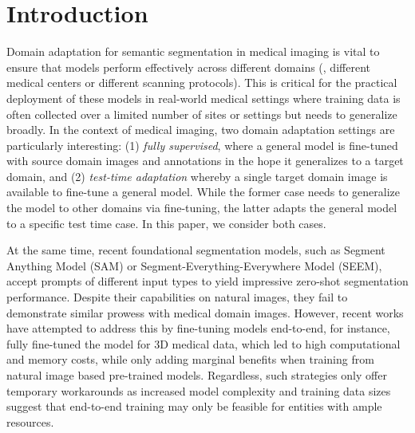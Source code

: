 \section{Introduction}
\label{sec:samda_introduction}

Domain adaptation for semantic segmentation in medical imaging is vital to ensure that models perform effectively across different domains (\eg, different medical centers or different scanning protocols). This is critical for the practical deployment of these models in real-world medical settings where training data is often collected over a limited number of sites or settings but needs to generalize broadly. In the context of medical imaging, two domain adaptation settings are particularly interesting: (1) {\it fully supervised}, where a general model is fine-tuned with source domain images and annotations in the hope it generalizes to a target domain, and (2) {\it test-time adaptation} whereby a single target domain image is available to fine-tune a general model. While the former case needs to generalize the model to other domains via fine-tuning, the latter adapts the general model to a specific test time case. In this paper, we consider both cases. 


At the same time, recent foundational segmentation models, such as Segment Anything Model (SAM) or Segment-Everything-Everywhere Model (SEEM), accept prompts of different input types to yield impressive zero-shot segmentation performance. Despite their capabilities on natural images, they fail to demonstrate similar prowess with medical domain images. 
However, recent works have attempted to address this by fine-tuning models end-to-end, for instance, fully fine-tuned the model for 3D medical data, which led to high computational and memory costs, while only adding marginal benefits when training from natural image based pre-trained models. Regardless, such strategies only offer temporary workarounds as increased model complexity and training data sizes suggest that end-to-end training may only be feasible for entities with ample resources.

